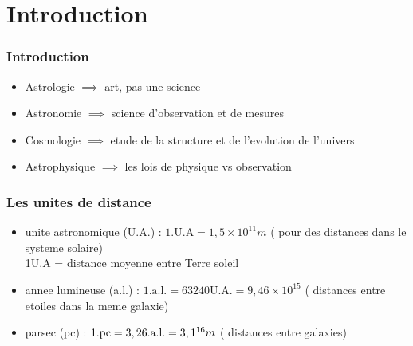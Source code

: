 \documentclass[12pt]{book}
\begin{document}
    \chapter{Introduction}
        \subsection{Introduction}
            \begin{itemize}
                \item Astrologie $ \implies $ art, pas une science
                \item Astronomie $ \implies $ science d'observation et de mesures 
                \item Cosmologie $ \implies $ etude de la structure et de l'evolution de l'univers
                \item Astrophysique $ \implies $ les lois de physique vs observation
            \end{itemize}
        \subsection{Les unites de distance}
            \begin{itemize}
                \item unite astronomique (U.A.) : $ 1.\text{U.A}=1,5\times 10^{11}m $ ( pour des distances dans le systeme solaire) \\
                    1U.A = distance moyenne entre Terre soleil
                \item annee lumineuse (a.l.) : $ 1.\text{a.l.} = 63240 \text{U.A.} = 9,46\times 10 ^{15} $ ( distances entre etoiles dans la meme galaxie)
                \item parsec (pc) : $ 1.\text{pc} = 3,26.\text{a.l.}=3,1\time 10^{16} m$ ( distances entre galaxies)
            \end{itemize}
        \pagebreak
\end{document}
